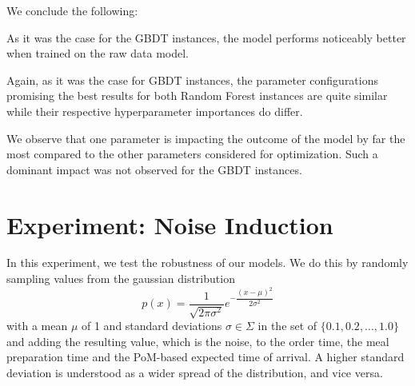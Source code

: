 We conclude the following:
\begin{description}[font=$\bullet$\scshape\bfseries]
	\item As it was the case for the GBDT instances, the model performs noticeably better when trained on the raw data model.
	\item Again, as it was the case for GBDT instances, the parameter configurations promising the best results for both Random Forest instances are quite similar while their respective hyperparameter importances do differ. 
	\item We observe that one parameter is impacting the outcome of the model by far the most compared to the other parameters considered for optimization. Such a dominant impact was not observed for the GBDT instances.
\end{description}
\section{Experiment: Noise Induction}\label{sec:noise}
In this experiment, we test the robustness of our models. We do this by randomly sampling values from the gaussian distribution
\begin{equation}
	p(x) = \dfrac{1}{\sqrt{2\pi\sigma^{2}}} e^{-\dfrac{(x-\mu)^2}{2\sigma^2}}
\end{equation}
with a mean $ \mu $ of 1 and standard deviations $ \sigma \in \Sigma $ in the set of $ \{0.1, 0.2, \dots, 1.0\} $ and adding the resulting value, which is the noise, to the order time, the meal preparation time and the PoM-based expected time of arrival. A higher standard deviation is understood as a wider spread of the distribution, and vice versa. 

